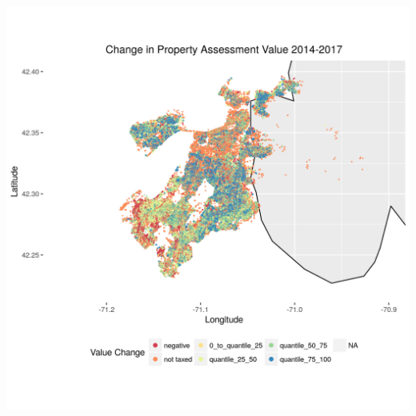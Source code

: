 \documentclass[12pt]{article}
\begin{document}
\includegraphics[scale=0.75]{property_delta2014-2017}


 

\end{document}
